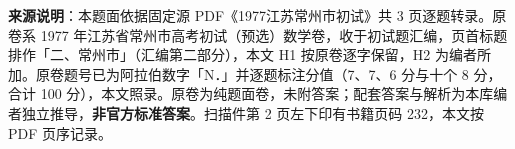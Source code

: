 


\begin{gktip}
\textbf{来源说明}：本题面依据固定源 PDF《1977江苏常州市初试》共 3 页逐题转录。原卷系 1977 年江苏省常州市高考初试（预选）数学卷，收于初试题汇编，页首标题排作「二、常州市」（汇编第二部分），本文 H1 按原卷逐字保留，H2 为编者所加。原卷题号已为阿拉伯数字「N．」并逐题标注分值（7、7、6 分与十个 8 分，合计 100 分），本文照录。原卷为纯题面卷，未附答案；配套答案与解析为本库编者独立推导，\textbf{非官方标准答案}。扫描件第 2 页左下印有书籍页码 232，本文按 PDF 页序记录。
\end{gktip}

\par\medskip

